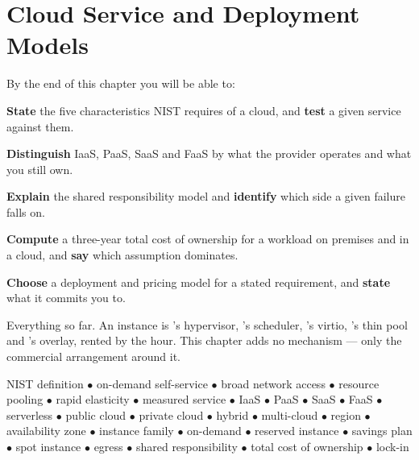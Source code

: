 \chapter{Cloud Service and Deployment Models}\label{ch:cloud}

\begin{outcomes}
By the end of this chapter you will be able to:
\begin{tight}
  \item \textbf{State} the five characteristics NIST requires of a cloud, and
        \textbf{test} a given service against them.
  \item \textbf{Distinguish} IaaS, PaaS, SaaS and FaaS by what the provider
        operates and what you still own.
  \item \textbf{Explain} the shared responsibility model and \textbf{identify}
        which side a given failure falls on.
  \item \textbf{Compute} a three-year total cost of ownership for a workload on
        premises and in a cloud, and \textbf{say} which assumption dominates.
  \item \textbf{Choose} a deployment and pricing model for a stated
        requirement, and \textbf{state} what it commits you to.
\end{tight}
\end{outcomes}

\begin{prereq}
Everything so far. An instance is 's hypervisor,
's scheduler, 's virtio, 's thin
pool and 's overlay, rented by the hour. This chapter adds no
mechanism --- only the commercial arrangement around it.
\end{prereq}

\begin{keyterms}
NIST definition $\bullet$ on-demand self-service $\bullet$ broad network access
$\bullet$ resource pooling $\bullet$ rapid elasticity $\bullet$ measured
service $\bullet$ IaaS $\bullet$ PaaS $\bullet$ SaaS $\bullet$ FaaS $\bullet$
serverless $\bullet$ public cloud $\bullet$ private cloud $\bullet$ hybrid
$\bullet$ multi-cloud $\bullet$ region $\bullet$ availability zone $\bullet$
instance family $\bullet$ on-demand $\bullet$ reserved instance $\bullet$
savings plan $\bullet$ spot instance $\bullet$ egress $\bullet$ shared
responsibility $\bullet$ total cost of ownership $\bullet$ lock-in
\end{keyterms}


